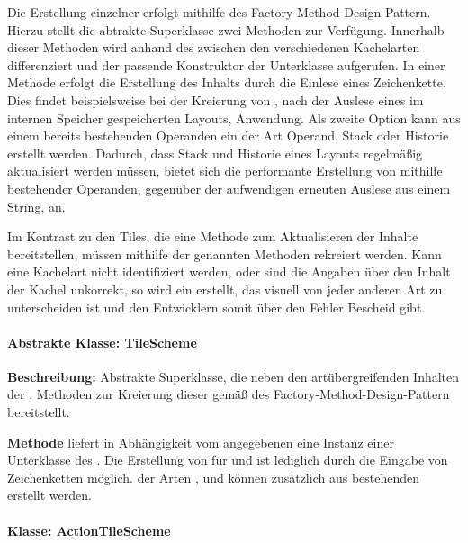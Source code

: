 Die Erstellung einzelner  erfolgt mithilfe des Factory-Method-Design-Pattern. Hierzu stellt die abtrakte Superklasse  zwei Methoden zur Verfügung. Innerhalb dieser Methoden wird anhand des  zwischen den verschiedenen Kachelarten differenziert und der passende Konstruktor der Unterklasse aufgerufen. In einer Methode erfolgt die Erstellung des  Inhalts durch die Einlese eines Zeichenkette. Dies findet beispielsweise bei der Kreierung von , nach der Auslese eines im internen Speicher gespeicherten Layouts, Anwendung. Als zweite Option kann aus einem bereits bestehenden Operanden ein  der Art Operand, Stack oder Historie erstellt werden. Dadurch, dass Stack und Historie eines Layouts regelmäßig aktualisiert werden müssen, bietet sich die performante Erstellung von  mithilfe bestehender Operanden, gegenüber der aufwendigen erneuten Auslese aus einem String, an.

Im Kontrast zu den Tiles, die eine Methode zum Aktualisieren der Inhalte bereitstellen, müssen  mithilfe der genannten Methoden rekreiert werden. Kann eine Kachelart nicht identifiziert werden, oder sind die Angaben über den Inhalt der Kachel unkorrekt, so wird ein  erstellt, das visuell von jeder anderen Art zu unterscheiden ist und den Entwicklern somit über den Fehler Bescheid gibt.

\paragraph{Abstrakte Klasse: TileScheme}

\textbf{Beschreibung: }Abstrakte Superklasse, die neben den artübergreifenden Inhalten der , Methoden zur Kreierung dieser gemäß des Factory-Method-Design-Pattern bereitstellt.

\textbf{Methode}  liefert in Abhängigkeit vom angegebenen  eine Instanz einer Unterklasse des . Die Erstellung von  für  und  ist lediglich durch die Eingabe von Zeichenketten möglich.  der Arten ,  und  können zusätzlich aus bestehenden  erstellt werden. 

\paragraph{Klasse: ActionTileScheme}

